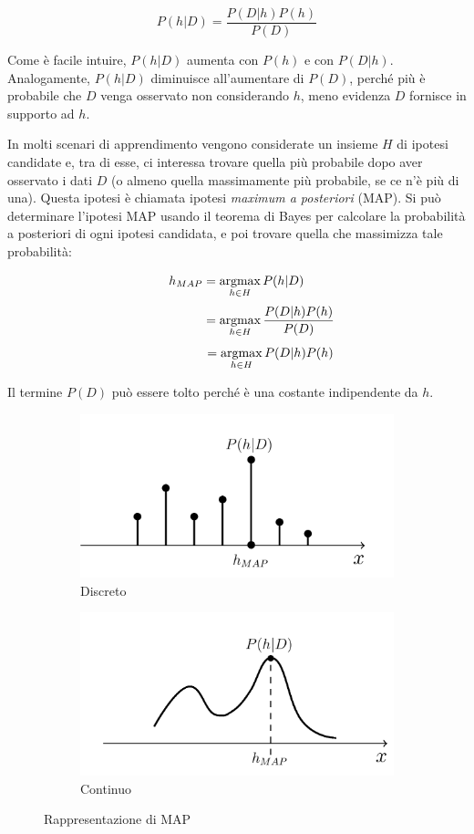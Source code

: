 $$ P(h|D) = \frac{P(D|h) P(h)}{P(D)} $$

Come è facile intuire, $P(h|D)$ aumenta con $P(h)$ e con $P(D|h)$. Analogamente, $P(h|D)$ diminuisce all'aumentare di $P(D)$, perché più è probabile che $D$ venga osservato non considerando $h$, meno evidenza $D$ fornisce in supporto ad $h$.

In molti scenari di apprendimento vengono considerate un insieme $H$ di ipotesi candidate e, tra di esse, ci interessa trovare quella più probabile dopo aver osservato i dati $D$ (o almeno quella massimamente più probabile, se ce n'è più di una). Questa ipotesi è chiamata ipotesi \emph{maximum a posteriori} (MAP). Si può determinare l'ipotesi MAP usando il teorema di Bayes per calcolare la probabilità a posteriori di ogni ipotesi candidata, e poi trovare quella che massimizza tale probabilità:

$$h_{MAP} = \operatorname*{argmax}_{h \in H} P(h|D) $$
$$\hphantom{1111111111} = \operatorname*{argmax}_{h \in H} \frac{P(D|h) P(h)}{P(D)} $$
$$\hphantom{1111111111} = \operatorname*{argmax}_{h \in H} P(D|h) P(h) $$

\noindent
Il termine $P(D)$ può essere tolto perché è una costante indipendente da $h$.

\begin{figure}[htbp!]
	\begin{subfigure}{.5\textwidth}
		\centering
		\includegraphics[width=.8\linewidth]{./images/discr}
		\caption{Discreto}
		\label{fig:discr}
	\end{subfigure}
	\begin{subfigure}{.5\textwidth}
		\centering
		\includegraphics[width=.8\linewidth]{./images/cont}
		\caption{Continuo}
		\label{fig:cont}
	\end{subfigure}
	\caption{Rappresentazione di MAP}
	\label{fig:hmap}
\end{figure}

